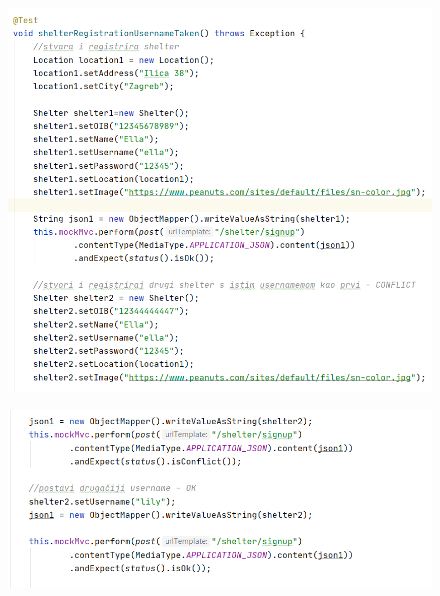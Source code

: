 		 	\begin{figure}[H]
		 		\centerline{
		 			\includegraphics[scale=0.75]{slike/shelter2.1.PNG}} %
		 		\centering
		 	\end{figure}
		 	\begin{figure}[H]
		 		\hspace*{-0.2in}
		 		\includegraphics[scale=0.75]{slike/shelter2.2.PNG} %
		 		\centering
		 	\end{figure}
	 	
	 	
	 	
